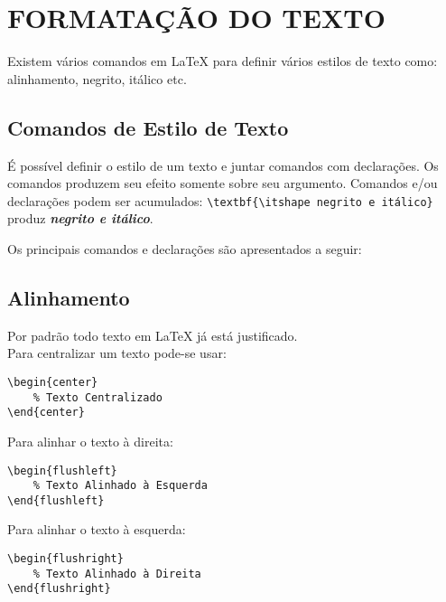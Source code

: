 
\chapter{FORMATAÇÃO DO TEXTO}

Existem vários comandos em \LaTeX{} para definir vários estilos de texto como: alinhamento, negrito, itálico etc.

\section{Comandos de Estilo de Texto}

É possível definir o estilo de um texto e juntar comandos com declarações.
Os comandos produzem seu efeito somente sobre seu argumento.
Comandos e/ou declarações podem ser acumulados: \verb|\textbf{\itshape negrito e itálico}| produz \textbf{\itshape negrito e itálico}.

Os principais comandos e declarações são apresentados a seguir:



\section{Alinhamento}

Por padrão todo texto em \LaTeX{} já está justificado.\\

Para centralizar um texto pode-se usar:

\begin{verbatim}
\begin{center}
    % Texto Centralizado
\end{center}
\end{verbatim}

Para alinhar o texto à direita:

\begin{verbatim}
\begin{flushleft}
    % Texto Alinhado à Esquerda
\end{flushleft}
\end{verbatim}

Para alinhar o texto à esquerda:

\begin{verbatim}
\begin{flushright}
    % Texto Alinhado à Direita
\end{flushright}
\end{verbatim}

